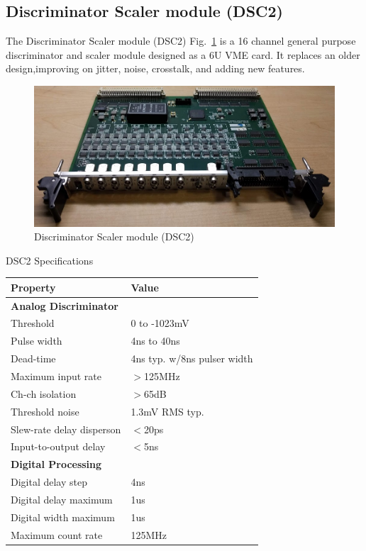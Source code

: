 \subsection{Discriminator Scaler module (DSC2)}

The Discriminator Scaler module (DSC2) Fig.~\ref{fig:dsc2_board} is a 16 channel general purpose discriminator and scaler module designed as a 6U VME card. It replaces an older design,improving on jitter, noise, crosstalk, and adding new features.

\begin{figure}[hbt]
	\centering
	\includegraphics[width=1.0\columnwidth,keepaspectratio]{img/dsc2_board.png}
	\caption{Discriminator Scaler module (DSC2)}
	\label{fig:dsc2_board}
\end{figure}

\begin{center}
	DSC2 Specifications\\
	\begin{tabular}{| l | l |}
		\hline \hline
		Property			& Value				\\
		\hline
		{\bf Analog Discriminator}	&				\\
		Threshold			& 0 to -1023mV			\\
		Pulse width			& 4ns to 40ns			\\
		Dead-time			& 4ns typ. w/8ns pulser width	\\
		Maximum input rate		& $>$125MHz 			\\
		Ch-ch isolation			& $>$65dB			\\
		Threshold noise			& 1.3mV RMS typ.		\\
		Slew-rate delay disperson	& $<$20ps			\\
		Input-to-output delay		& $<$5ns			\\
		{\bf Digital Processing}	&				\\
		Digital delay step		& 4ns				\\
		Digital delay maximum		& 1us				\\
		Digital width maximum		& 1us				\\
		Maximum count rate		& 125MHz			\\
		\hline \hline
	\end{tabular}
\end{center}

